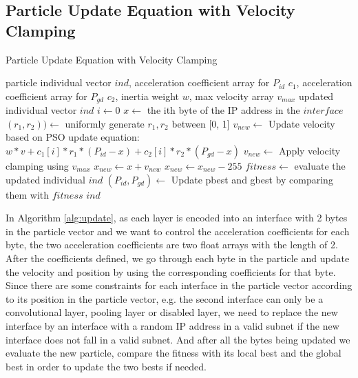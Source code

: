 \documentclass[conference]{IEEEtran}
\begin{document}
\subsection{Particle Update Equation with Velocity Clamping}
\begin{algorithm}
	\caption{Particle Update Equation with Velocity Clamping}
	\label{alg:update}
	\begin{algorithmic}
		\renewcommand{\algorithmicrequire}{\textbf{Input:}}
		\renewcommand{\algorithmicensure}{\textbf{Output:}}
		\REQUIRE particle individual vector $ind$, acceleration coefficient array for $P_{id}$ $c_{1}$, acceleration coefficient array for $P_{gd}$ $c_{2}$, inertia weight $w$, max velocity array $v_{max}$
		\ENSURE updated individual vector $ind$
			\STATE $i \leftarrow 0$
				\STATE $x \leftarrow$ the ith byte of the IP address in the $interface$
				\STATE $(r_{1}, r_{2})) \leftarrow$ uniformly generate $r_{1}, r_{2}$ between [0, 1]
				\STATE $v_{new} \leftarrow$ Update velocity based on PSO update equation: $w * v + c_{1}[i] * r_{1} * (P_{id} - x) + c_{2}[i] * r_{2} * (P_{gd} - x)$
				\STATE $v_{new} \leftarrow$ Apply velocity clamping using $v_{max}$
				\STATE $x_{new} \leftarrow x + v_{new}$
					\STATE $x_{new} \leftarrow x_{new}-255$
				\ENDIF
			\ENDFOR
		\ENDFOR
		\STATE $fitness \leftarrow$ evaluate the updated individual $ind$
		\STATE $(P_{id}, P_{gd}) \leftarrow$ Update pbest and gbest by comparing them with $fitness$
		\RETURN $ind$
	\end{algorithmic}
\end{algorithm}

In Algorithm \ref{alg:update}, as each layer is encoded into an interface with 2 bytes in the particle vector and we want to control the acceleration coefficients for each byte, the two acceleration coefficients are two float arrays with the length of 2. 
After the coefficients defined, we go through each byte in the particle and update the velocity and position by using the corresponding coefficients for that byte. Since there are some constraints for each interface in the particle vector according to its position in the particle vector, e.g. the second interface can only be a convolutional layer, pooling layer or disabled layer, we need to replace the new interface by an interface with a random IP address in a valid subnet if the new interface does not fall in a valid subnet. And after all the bytes being updated we evaluate the new particle, compare the fitness with its local best and the global best in order to update the two bests if needed.
\end{document}
